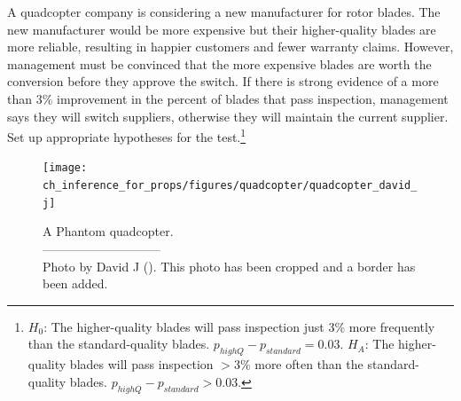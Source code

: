 \begin{exercise}\label{carWheelBladeManufacturer}
A quadcopter company is considering a new manufacturer for rotor blades. The new manufacturer would be more expensive but their higher-quality blades are more reliable, resulting in happier customers and fewer warranty claims. However, management must be convinced that the more expensive blades are worth the conversion before they approve the switch. If there is strong evidence of a more than 3\% improvement in the percent of blades that pass inspection, management says they will switch suppliers, otherwise they will maintain the current supplier. Set up appropriate hypotheses for the test.\footnote{$H_0$: The higher-quality blades will pass inspection just 3\% more frequently than the standard-quality blades. $p_{highQ} - p_{standard} = 0.03$. $H_A$: The higher-quality blades will pass inspection $>$3\% more often than the standard-quality blades. $p_{highQ} - p_{standard} > 0.03$.}
\end{exercise}

\setlength{\captionwidth}{85mm}

\begin{figure}
\centering
\texttt{[image: ch\_inference\_for\_props/figures/quadcopter/quadcopter\_david\_j]}
\caption{A Phantom quadcopter.\vspace{-1mm} \\
   -----------------------------\vspace{-2mm}\\
   {\footnotesize Photo by David J ().  This photo has been cropped and a border has been added.}}
\label{quadcopter_david_j}
\end{figure}

\setlength{\captionwidth}{\mycaptionwidth}


